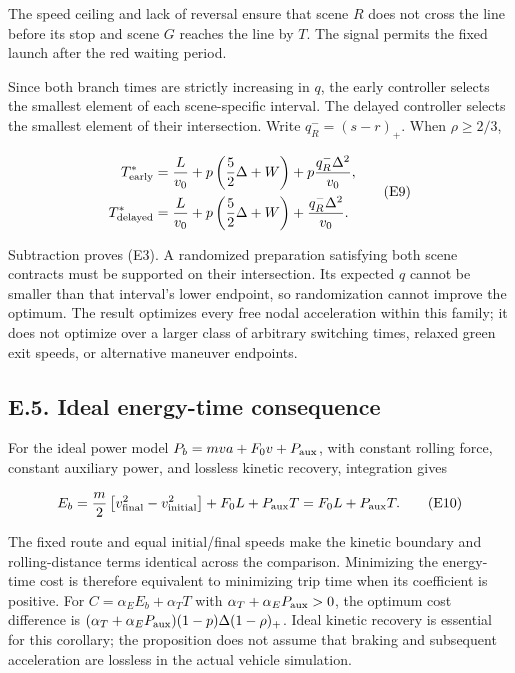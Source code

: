 \documentclass[letterpaper,journal,onecolumn]{IEEEtran}
\begin{document}
The speed ceiling and lack of reversal ensure that scene \(R\) does not cross the line before its stop and scene \(G\) reaches the line by \(T\). The signal permits the fixed launch after the red waiting period.

Since both branch times are strictly increasing in \(q\), the early controller selects the smallest element of each scene-specific interval. The delayed controller selects the smallest element of their intersection. Write \(q_R^-=(s-r)_+\). When \(\rho\ge2/3\),

\[
\begin{aligned}
T^*_{\rm early}
&=\frac{L}{v_0}+p\left(\frac52\Delta+W\right)
+p\frac{q_R^-\Delta^2}{v_0},\\
T^*_{\rm delayed}
&=\frac{L}{v_0}+p\left(\frac52\Delta+W\right)
+\frac{q_R^-\Delta^2}{v_0}.
\end{aligned}
\tag{E9}
\]

Subtraction proves (E3). A randomized preparation satisfying both scene contracts must be supported on their intersection. Its expected \(q\) cannot be smaller than that interval's lower endpoint, so randomization cannot improve the optimum. The result optimizes every free nodal acceleration within this family; it does not optimize over a larger class of arbitrary switching times, relaxed green exit speeds, or alternative maneuver endpoints.

\subsection*{E.5. Ideal energy-time consequence}

For the ideal power model \(P_b=mva+F_0v+P_{\rm aux}\), with constant rolling force, constant auxiliary power, and lossless kinetic recovery, integration gives

\[
E_b=\frac m2\left[v_{\rm final}^2-v_{\rm initial}^2\right]
+F_0L+P_{\rm aux}T
=F_0L+P_{\rm aux}T.
\tag{E10}
\]

The fixed route and equal initial/final speeds make the kinetic boundary and rolling-distance terms identical across the comparison. Minimizing the energy-time cost is therefore equivalent to minimizing trip time when its coefficient is positive. For \(C=\alpha_E E_b+\alpha_TT\) with \(\alpha_T+\alpha_EP_{\rm aux}>0\), the optimum cost difference is \((\alpha_T+\alpha_EP_{\rm aux})(1-p)\Delta(1-\rho)_+\). Ideal kinetic recovery is essential for this corollary; the proposition does not assume that braking and subsequent acceleration are lossless in the actual vehicle simulation.
\end{document}

